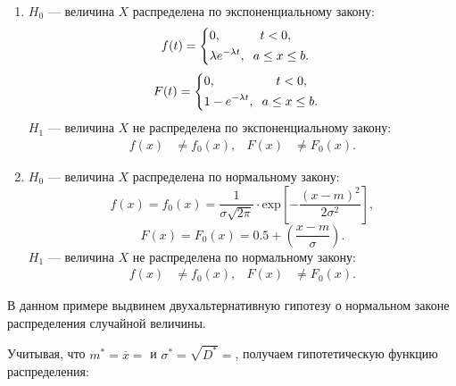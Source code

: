 \documentclass[14pt,hidelinks]{extarticle}
\begin{document}
\begin{enumerate}
\item
	$H_0$ --- величина $X$ распределена по экспоненциальному закону:
	\begin{equation}
		\begin{aligned}
			&f(t)=
			\left\{
				\begin{aligned}
					&0, \hspace{11mm} t < 0, \\
					&\lambda e^{-\lambda t}, \hspace{2mm} a \le x \le b.
				\end{aligned}
			\right.
		\end{aligned}
	\end{equation}
	\begin{equation}
		\begin{aligned}
			&F(t)=
			\left\{
				\begin{aligned}
					&0, \hspace{17mm} t < 0, \\
					&1 - e^{-\lambda t}, \hspace{2mm} a \le x \le b.
				\end{aligned}
			\right.
		\end{aligned}
	\end{equation}
	$H_1$ --- величина $X$ не распределена по экспоненциальному закону:
	\begin{align}
		f(x) & \neq f_0(x) ,&
		F(x) & \neq F_0(x).
	\end{align}

\item
	$H_0$ --- величина $X$ распределена по нормальному закону:
	\begin{equation}
	  f(x) = f_0(x) = \frac{1}{\sigma\sqrt{2\pi}} \cdot \text{exp} \left[-\frac{(x-m)^2}{2\sigma^2} \right],
	\end{equation}
	\begin{equation}
	  F(x) = F_0(x) = 0.5 + \left( \frac{x-m}{\sigma} \right).
	\end{equation}
	$H_1$ --- величина $X$ не распределена по нормальному закону:
	\begin{align}
		f(x) & \neq f_0(x) ,&
		F(x) & \neq F_0(x).
	\end{align}
\end{enumerate}

В данном примере выдвинем двухальтернативную гипотезу о нормальном законе распределения случайной величины.

Учитывая, что $m^* = \overline{x} = $ и $\sigma^* = \sqrt{D^*} = $, получаем гипотетическую функцию распределения:
\end{document}
